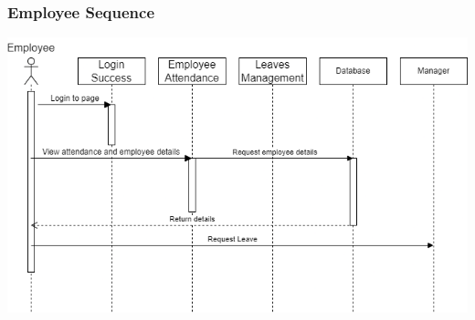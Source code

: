 \documentclass[a4paper, 12pt]{article}
\begin{document}
\subsubsection{Employee Sequence}
\begin{center}
\includegraphics[width=1\textwidth]{Employee Sequence.png}\par
\end{center}
\end{document}
